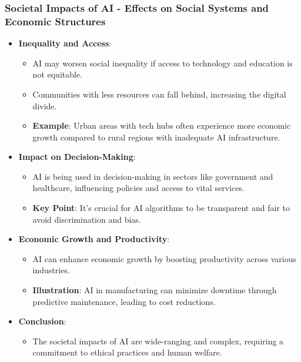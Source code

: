 \documentclass[aspectratio=169]{beamer}
\begin{document}
\begin{frame}[fragile]
    \frametitle{Societal Impacts of AI - Effects on Social Systems and Economic Structures}
    \begin{itemize}
        \item \textbf{Inequality and Access}:
            \begin{itemize}
                \item AI may worsen social inequality if access to technology and education is not equitable.
                \item Communities with less resources can fall behind, increasing the digital divide.
                \item \textbf{Example}: Urban areas with tech hubs often experience more economic growth compared to rural regions with inadequate AI infrastructure.
            \end{itemize}

        \item \textbf{Impact on Decision-Making}:
            \begin{itemize}
                \item AI is being used in decision-making in sectors like government and healthcare, influencing policies and access to vital services.
                \item \textbf{Key Point}: It's crucial for AI algorithms to be transparent and fair to avoid discrimination and bias.
            \end{itemize}

        \item \textbf{Economic Growth and Productivity}:
            \begin{itemize}
                \item AI can enhance economic growth by boosting productivity across various industries.
                \item \textbf{Illustration}: AI in manufacturing can minimize downtime through predictive maintenance, leading to cost reductions.
            \end{itemize}
        
        \item \textbf{Conclusion}:
            \begin{itemize}
                \item The societal impacts of AI are wide-ranging and complex, requiring a commitment to ethical practices and human welfare.
            \end{itemize}
    \end{itemize}
\end{frame}
\end{document}
